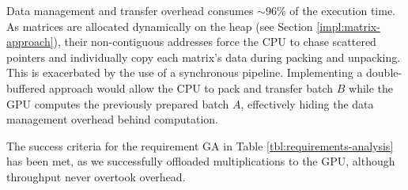 Data management and transfer overhead consumes $\sim$96\% of the execution time.
As matrices are allocated dynamically on the heap (see Section \ref{impl:matrix-approach}),
their non-contiguous addresses force the CPU to chase scattered pointers and individually copy each matrix's data
during packing and unpacking.
This is exacerbated by the use of a synchronous pipeline. Implementing a double-buffered approach would allow the CPU 
to pack and transfer batch $B$ while the GPU computes the previously prepared batch $A$, effectively hiding the data management 
overhead behind computation.

The success criteria for the requirement GA in Table \ref{tbl:requirements-analysis}
has been met, as we successfully offloaded multiplications to the GPU, although throughput never overtook overhead.
\enlargethispage{2\baselineskip}

